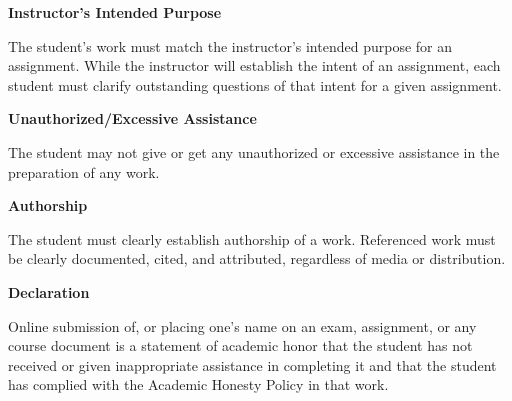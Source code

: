\documentclass[11pt]{article}
\begin{document}
\textbf{Instructor's Intended Purpose}

\hspace{3mm}
\hangindent=5mm The student's work must match the instructor's intended purpose
for an assignment. While the instructor will establish the intent of an
assignment, each student must clarify outstanding questions of that intent for a
given assignment. 

\textbf{Unauthorized/Excessive Assistance}

\hspace{3mm}
\hangindent=5mm The student may not give or get any unauthorized or excessive
assistance in the preparation of any work.

\textbf{Authorship}

\hspace{3mm}
\hangindent=5mm The student must clearly establish authorship of a work.
Referenced work must be clearly documented, cited, and attributed, regardless of
media or distribution. 

\textbf{Declaration}

\hspace{3mm}
\hangindent=5mm Online submission of, or placing one's name on an exam,
assignment, or any course document is a statement of academic honor that the
student has not received or given inappropriate assistance in completing it and
that the student has complied with the Academic Honesty Policy in that work.
\end{document}
